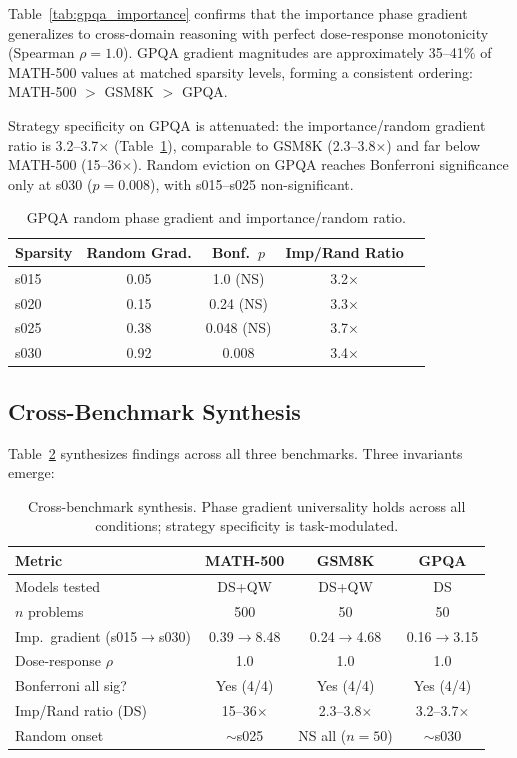\documentclass[11pt,a4paper]{article}
\begin{document}
Table~\ref{tab:gpqa_importance} confirms that the importance phase gradient generalizes to cross-domain reasoning with perfect dose-response monotonicity (Spearman $\rho = 1.0$). GPQA gradient magnitudes are approximately 35--41\% of MATH-500 values at matched sparsity levels, forming a consistent ordering: MATH-500 $>$ GSM8K $>$ GPQA.

Strategy specificity on GPQA is attenuated: the importance/random gradient ratio is 3.2--3.7$\times$ (Table~\ref{tab:gpqa_random}), comparable to GSM8K (2.3--3.8$\times$) and far below MATH-500 (15--36$\times$). Random eviction on GPQA reaches Bonferroni significance only at s030 ($p = 0.008$), with s015--s025 non-significant.

\begin{table}[t]
\centering
\small
\caption{GPQA random phase gradient and importance/random ratio.}
\label{tab:gpqa_random}
\begin{tabular}{lcccc}
\toprule
Sparsity & Random Grad. & Bonf.\ $p$ & Imp/Rand Ratio \\
\midrule
s015 & 0.05 & 1.0 (NS) & 3.2$\times$ \\
s020 & 0.15 & 0.24 (NS) & 3.3$\times$ \\
s025 & 0.38 & 0.048 (NS) & 3.7$\times$ \\
s030 & 0.92 & 0.008 & 3.4$\times$ \\
\bottomrule
\end{tabular}
\end{table}

\subsection{Cross-Benchmark Synthesis}
\label{sec:synthesis}

Table~\ref{tab:synthesis} synthesizes findings across all three benchmarks. Three invariants emerge:

\begin{table}[t]
\centering
\small
\caption{Cross-benchmark synthesis. Phase gradient universality holds across all conditions; strategy specificity is task-modulated.}
\label{tab:synthesis}
\begin{tabular}{lccc}
\toprule
Metric & MATH-500 & GSM8K & GPQA \\
\midrule
Models tested & DS+QW & DS+QW & DS \\
$n$ problems & 500 & 50 & 50 \\
Imp.\ gradient (s015$\to$s030) & 0.39$\to$8.48 & 0.24$\to$4.68 & 0.16$\to$3.15 \\
Dose-response $\rho$ & 1.0 & 1.0 & 1.0 \\
Bonferroni all sig? & Yes (4/4) & Yes (4/4) & Yes (4/4) \\
Imp/Rand ratio (DS) & 15--36$\times$ & 2.3--3.8$\times$ & 3.2--3.7$\times$ \\
Random onset & $\sim$s025 & NS all ($n=50$) & $\sim$s030 \\
\bottomrule
\end{tabular}
\end{table}
\end{document}
